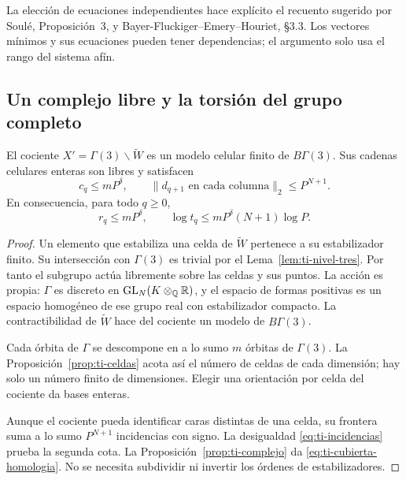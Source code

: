La elección de ecuaciones independientes hace explícito el
recuento sugerido por Soulé, Proposición~3, y
Bayer-Fluckiger--Emery--Houriet, §3.3. Los vectores mínimos
y sus ecuaciones pueden tener dependencias; el argumento
solo usa el rango del sistema afín.

\subsection{Un complejo libre y la torsión del grupo completo}

\begin{proposicion}
\label{prop:ti-cubierta}
El cociente $X'=\Gamma(3)\backslash\widetilde W$ es un
modelo celular finito de $B\Gamma(3)$.
Sus cadenas celulares enteras son libres y satisfacen
\begin{equation}
 c_q\le mP^\delta,\qquad
 \|d_{q+1}\text{ en cada columna}\|_2\le P^{N+1}.
 \label{eq:ti-cubierta}
\end{equation}
En consecuencia, para todo $q\ge0$,
\begin{equation}
 r_q\le mP^\delta,\qquad
 \log t_q\le mP^\delta(N+1)\log P.
 \label{eq:ti-cubierta-homologia}
\end{equation}
\end{proposicion}

\begin{proof}
Un elemento que estabiliza una celda de $\widetilde W$
pertenece a su estabilizador finito. Su intersección con
$\Gamma(3)$ es trivial por el Lema~\ref{lem:ti-nivel-tres}.
Por tanto el subgrupo actúa libremente sobre las celdas
y sus puntos. La acción es propia: $\Gamma$ es discreto
en $\operatorname{GL}_N(K\otimes_{\mathbb{Q}}\mathbb{R})$, y el espacio
de formas positivas es un espacio homogéneo de ese grupo
real con estabilizador compacto. La contractibilidad de
$\widetilde W$ hace del cociente un modelo de
$B\Gamma(3)$.

Cada órbita de $\Gamma$ se descompone en a lo sumo $m$
órbitas de $\Gamma(3)$. La Proposición~\ref{prop:ti-celdas}
acota así el número de celdas de cada dimensión; hay
solo un número finito de dimensiones. Elegir una
orientación por celda del cociente da bases enteras.

Aunque el cociente pueda identificar caras distintas de
una celda, su frontera suma a lo sumo $P^{N+1}$
incidencias con signo. La desigualdad
\eqref{eq:ti-incidencias} prueba la segunda cota.
La Proposición~\ref{prop:ti-complejo} da
\eqref{eq:ti-cubierta-homologia}. No se necesita subdividir
ni invertir los órdenes de estabilizadores.
\end{proof}

